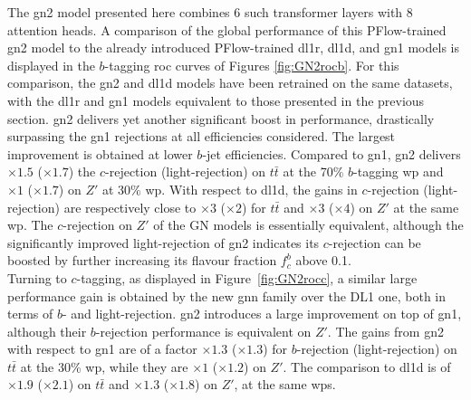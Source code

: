 The \gls{gn2} model presented here combines 6 such transformer layers with 8 attention heads. A comparison of the global performance of this PFlow-trained \gls{gn2} model to the already introduced PFlow-trained \gls{dl1r}, \gls{dl1d}, and \gls{gn1} models is displayed in the $b$-tagging \gls{roc} curves of Figures \ref{fig:GN2rocb}. For this comparison, the \gls{gn2} and \gls{dl1d} models have been retrained on the same datasets, with the \gls{dl1r} and \gls{gn1} models equivalent to those presented in the previous section. \gls{gn2} delivers yet another significant boost in performance, drastically surpassing the \gls{gn1} rejections at all efficiencies considered. The largest improvement is obtained at lower $b$-jet efficiencies. Compared to \gls{gn1}, \gls{gn2} delivers $\times 1.5$ ($\times 1.7$) the $c$-rejection (light-rejection) on $t\bar{t}$ at the 70\% $b$-tagging \gls{wp} and $\times 1$ ($\times 1.7$) on $Z'$ at 30\% \gls{wp}. With respect to \gls{dl1d}, the gains in $c$-rejection (light-rejection) are respectively close to $\times 3$ ($\times 2$) for $t\bar{t}$ and $\times 3$ ($\times 4$) on $Z'$ at the same \gls{wp}. The $c$-rejection on $Z'$ of the GN models is essentially equivalent, although the significantly improved light-rejection of \gls{gn2} indicates its $c$-rejection can be boosted by further increasing its flavour fraction $f^b_c$ above 0.1. \\

Turning to $c$-tagging, as displayed in Figure~\ref{fig:GN2rocc}, a similar large performance gain is obtained by the new \gls{gnn} family over the DL1 one, both in terms of $b$- and light-rejection. \gls{gn2} introduces a large improvement on top of \gls{gn1}, although their $b$-rejection performance is equivalent on $Z'$. The gains from \gls{gn2} with respect to \gls{gn1} are of a factor $\times 1.3$ ($\times 1.3$) for $b$-rejection (light-rejection) on $t\bar{t}$ at the 30\% \gls{wp}, while they are $\times 1$ ($\times 1.2$) on $Z'$. The comparison to \gls{dl1d} is of $\times 1.9$ ($\times 2.1$) on $t\bar{t}$ and $\times 1.3$ ($\times 1.8$) on $Z'$, at the same \glspl{wp}. \\

